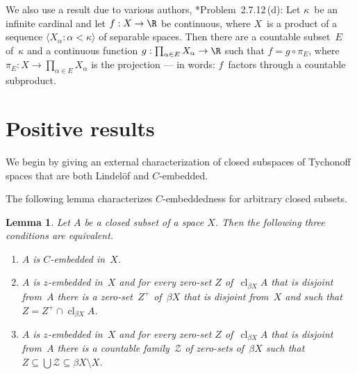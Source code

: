 \documentclass[a4paper]{amsart}
\newcommand\calZ{\mathcal{Z}}
\newcommand\cl{\operatorname{cl}}
\newcommand\clbeta[1][X]{\cl_{\beta #1}}
\theoremstyle{plain}
\newtheorem{lemma}[theorem]{Lemma}
\theoremstyle{definition}
\theoremstyle{remark}
\begin{document}
\smallbreak
We also use a result due to various authors,
\cite{MR1039321}*{Problem~2.7.12\,(d)}: 
Let $\kappa$~be an infinite cardinal and let $f:X\to\R$ be continuous,
where $X$~is a product of a sequence $\langle X_\alpha:\alpha<\kappa\rangle$
of separable spaces.
Then there are a countable subset~$E$ of~$\kappa$ and a continuous function
$g:\prod_{\alpha\in E}X_\alpha\to\R$ such that $f=g\circ\pi_E$, 
where $\pi_E:X\to\prod_{\alpha\in E}X_\alpha$ is the projection 
--- in words: $f$~factors through a countable subproduct.

\section{Positive results}

We begin by giving an external characterization of closed subspaces
of Tychonoff spaces that are both Lindel\"of and $C$-embedded.

The following lemma characterizes $C$-embeddedness for arbitrary closed 
subsets.

\begin{lemma}\label{lemma.1st}
Let $A$ be a closed subset of a space $X$.
Then the following three conditions are equivalent.
\begin{enumerate}
\item $A$ is $C$-embedded in~$X$.
\item $A$ is $z$-embedded in~$X$ and for every zero-set $Z$ of~$\clbeta A$ 
      that is disjoint from~$A$ there is a zero-set~$Z^+$ of~$\beta X$ that 
      is disjoint from~$X$ and such that $Z=Z^+\cap\clbeta A$.
\item $A$ is $z$-embedded in~$X$ and for every zero-set $Z$ of~$\clbeta A$ 
      that is disjoint from~$A$ there is a countable family~$\calZ$ of 
      zero-sets of~$\beta X$ such that 
      $Z\subseteq\bigcup\calZ\subseteq\beta X\setminus X$.
\end{enumerate}
\end{lemma}
\end{document}
